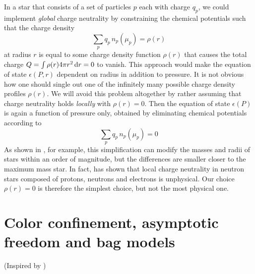 In a star that consists of a set of particles $p$ each with charge $q_p$, we could implement \emph{global} charge neutrality by constraining the chemical potentials such that the charge density
\begin{equation}
	\sum_p q_p \, n_p(\mu_p) = \rho(r)
\label{eq:intro:charge_neutrality_global}
\end{equation}
at radius $r$ is equal to some charge density function $\rho(r)$ that causes the total charge $Q = \int \rho(r) 4 \pi r^2 \mathop{}\!\mathrm{d} r = 0$  to vanish.
This approach would make the equation of state $\epsilon(P,r)$ dependent on radius in addition to pressure.
It is not obvious how one should single out one of the infinitely many possible charge density profiles $\rho(r)$.
We will avoid this problem altogether by rather assuming that charge neutrality holds \emph{locally} with $\rho(r) = 0$.
Then the equation of state $\epsilon(P)$ is again a function of pressure only, obtained by eliminating chemical potentials according to
\begin{equation}
	\sum_p q_p \, n_p(\mu_p) = 0
\label{eq:lsm:charge_neutrality}
\end{equation}
As shown in \cite{ref:global_neutrality}, for example, this simplification can modify the masses and radii of stars within an order of magnitude, but the differences are smaller closer to the maximum mass star.
In fact, \cite{ref:local_neutrality_inconsistent} has shown that local charge neutrality in neutron stars composed of protons, neutrons and electrons is unphysical.
Our choice $\rho(r)=0$ is therefore the simplest choice, but not the most physical one.

\section{Color confinement, asymptotic freedom and bag models}

(Inspired by \cite{ref:quark_bag_model})


